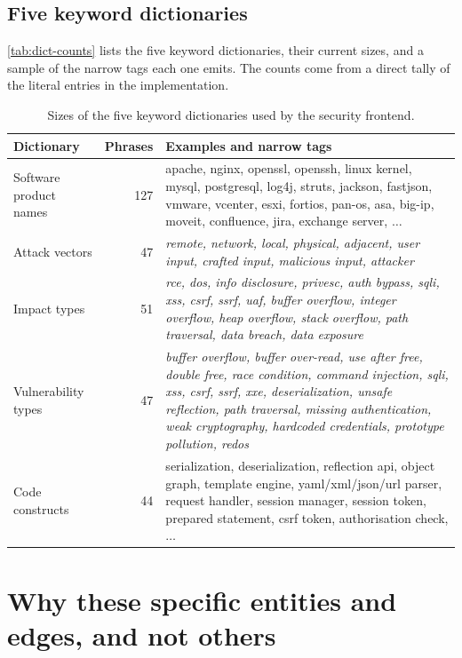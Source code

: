 \documentclass[11pt,a4paper]{article}
\begin{document}
\subsection{Five keyword dictionaries}

\autoref{tab:dict-counts} lists the five keyword
dictionaries, their current sizes, and a sample of the
narrow tags each one emits. The counts come from a direct
tally of the literal entries in the implementation.

\begin{table}[!htbp]
\centering\small
\begin{tabularx}{\linewidth}{l r X}
\toprule
\textbf{Dictionary} & \textbf{Phrases} &
\textbf{Examples and narrow tags} \\
\midrule
Software product names & 127 &
    apache, nginx, openssl, openssh, linux kernel, mysql,
    postgresql, log4j, struts, jackson, fastjson, vmware,
    vcenter, esxi, fortios, pan-os, asa, big-ip, moveit,
    confluence, jira, exchange server, $\dots$ \\
Attack vectors & 47 &
    \emph{remote, network, local, physical, adjacent,
    user input, crafted input, malicious input, attacker} \\
Impact types & 51 &
    \emph{rce, dos, info disclosure, privesc, auth bypass,
    sqli, xss, csrf, ssrf, uaf, buffer overflow,
    integer overflow, heap overflow, stack overflow,
    path traversal, data breach, data exposure} \\
Vulnerability types & 47 &
    \emph{buffer overflow, buffer over-read, use after free,
    double free, race condition, command injection, sqli,
    xss, csrf, ssrf, xxe, deserialization, unsafe reflection,
    path traversal, missing authentication, weak cryptography,
    hardcoded credentials, prototype pollution, redos} \\
Code constructs & 44 &
    serialization, deserialization, reflection api, object
    graph, template engine, yaml/xml/json/url parser,
    request handler, session manager, session token,
    prepared statement, csrf token, authorisation check,
    $\dots$ \\
\bottomrule
\end{tabularx}
\caption{Sizes of the five keyword dictionaries used by the
security frontend.}
\label{tab:dict-counts}
\end{table}

\section{Why these specific entities and edges, and not others}
\label{sec:why-these}
\end{document}
